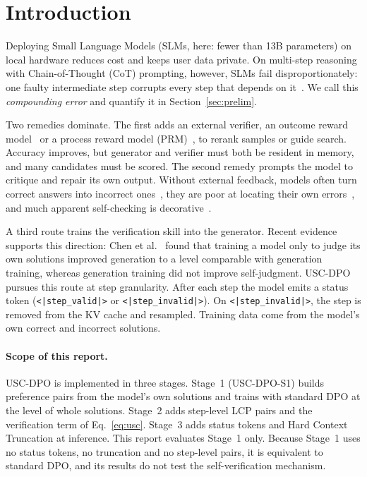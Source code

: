 \documentclass[11pt, a4paper]{article}
\newcommand{\valid}{\texttt{<|step\_\allowbreak valid|>}}
\newcommand{\invalid}{\texttt{<|step\_\allowbreak invalid|>}}
\newcommand{\soldpo}{USC-DPO-S1}
\begin{document}
\section{Introduction}
Deploying Small Language Models (SLMs, here: fewer than 13B parameters) on local hardware reduces cost and keeps user data private. On multi-step reasoning with Chain-of-Thought (CoT) prompting, however, SLMs fail disproportionately: one faulty intermediate step corrupts every step that depends on it~\cite{wei2022chain}. We call this \emph{compounding error} and quantify it in Section~\ref{sec:prelim}.

Two remedies dominate. The first adds an external verifier, an outcome reward model~\cite{cobbe2021training} or a process reward model (PRM)~\cite{lightman2023let, wang2024mathshepherd}, to rerank samples or guide search. Accuracy improves, but generator and verifier must both be resident in memory, and many candidates must be scored. The second remedy prompts the model to critique and repair its own output. Without external feedback, models often turn correct answers into incorrect ones~\cite{huang2023large}, they are poor at locating their own errors~\cite{tyen2024llms}, and much apparent self-checking is decorative~\cite{zhao2025aha}.

A third route trains the verification skill into the generator. Recent evidence supports this direction: Chen et al.~\cite{chen2026selfverify} found that training a model only to judge its own solutions improved generation to a level comparable with generation training, whereas generation training did not improve self-judgment. USC-DPO pursues this route at step granularity. After each step the model emits a status token (\valid{} or \invalid{}). On \invalid{}, the step is removed from the KV cache and resampled. Training data come from the model's own correct and incorrect solutions.

\paragraph{Scope of this report.} USC-DPO is implemented in three stages. Stage~1 (\soldpo{}) builds preference pairs from the model's own solutions and trains with standard DPO at the level of whole solutions. Stage~2 adds step-level LCP pairs and the verification term of Eq.~\eqref{eq:usc}. Stage~3 adds status tokens and Hard Context Truncation at inference. This report evaluates Stage~1 only. Because Stage~1 uses no status tokens, no truncation and no step-level pairs, it is equivalent to standard DPO, and its results do not test the self-verification mechanism.
\end{document}
